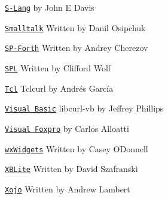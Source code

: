 \href{https://www.jedsoft.org/slang/modules/curl.html}{\texttt{S-\/\+Lang}} by John E Davis

\href{https://www.squeaksource.com/CurlPlugin/}{\texttt{Smalltalk}} Written by Danil Osipchuk

\href{https://sourceforge.net/p/spf/spf/ci/master/tree/devel/~ac/lib/lin/curl/}{\texttt{SP-\/\+Forth}} Written by Andrey Cherezov

\href{https://web.archive.org/web/20210203022158/www.clifford.at/spl/spldoc/curl.html}{\texttt{SPL}} Written by Clifford Wolf

\href{https://web.archive.org/web/20160826011806/mirror.yellow5.com/tclcurl/}{\texttt{Tcl}} Tclcurl by Andrés García

\href{https://sourceforge.net/projects/libcurl-vb/}{\texttt{Visual Basic}} libcurl-\/vb by Jeffrey Phillips

\href{https://web.archive.org/web/20130730181523/www.ctl32.com.ar/libcurl.asp}{\texttt{Visual Foxpro}} by Carlos Alloatti

\href{https://wxcode.sourceforge.net/components/wxcurl/}{\texttt{wx\+Widgets}} Written by Casey O\textquotesingle{}Donnell

\href{https://web.archive.org/web/20060426150418/perso.wanadoo.fr/xblite/libraries.html}{\texttt{XBLite}} Written by David Szafranski

\href{https://github.com/charonn0/RB-libcURL}{\texttt{Xojo}} Written by Andrew Lambert 